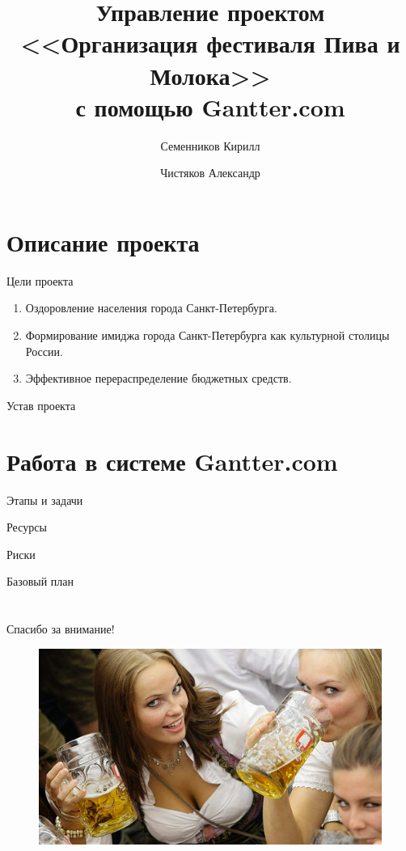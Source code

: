 \documentclass[10pt,pdf,hyperref=unicode,hyperref={bookmarks=false}]{beamer}
\title[Организация фестиваля Пива и Молока]{Управление проектом\\ <<Организация фестиваля Пива и Молока>>\\ с помощью Gantter.com}
\author{Семенников Кирилл\and Чистяков Александр}
\institute{Санкт-Петербургский национальный исследовательский университет информационных технологий, механики и оптики}
\begin{document}
  \begin{frame}
    \maketitle
  \end{frame}
  \section{Описание проекта}
    \begin{frame}{Цели проекта}
      \begin{enumerate}
        \item{Оздоровление населения города Санкт-Петербурга.}
        \item{Формирование имиджа города Санкт-Петербурга как культурной столицы России.}
        \item{Эффективное перераспределение бюджетных средств.}
      \end{enumerate}
    \end{frame} 
    \begin{frame}{Устав проекта}
    \end{frame}
  \section{Работа в системе Gantter.com}
    \begin{frame}{Этапы и задачи}
    \end{frame}
    \begin{frame}{Ресурсы}
    \end{frame}
    \begin{frame}{Риски}
    \end{frame}
    \begin{frame}{Базовый план}
    \end{frame}
  \section*{}
  \begin{frame}{Спасибо за внимание!}
    \begin{figure}
      \includegraphics[width=\textwidth]{beers1.jpg}
    \end{figure}
  \end{frame}
\end{document}
